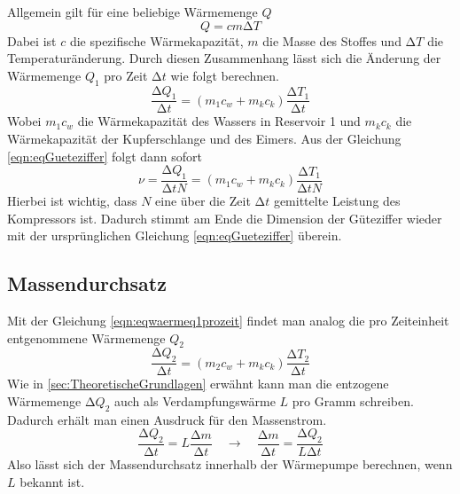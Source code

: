 Allgemein gilt für eine beliebige Wärmemenge $Q$
\begin{equation}
\label{eqn:allgwaerme}
Q = cm \increment T
\end{equation}
Dabei ist $c$ die spezifische Wärmekapazität, $m$ die Masse des Stoffes und $\increment T$ die Temperaturänderung.
Durch diesen Zusammenhang lässt sich die Änderung der Wärmemenge $Q_{1}$ pro Zeit $\increment t$ wie folgt berechnen.
\begin{equation}
\label{eqn:eqwaermeq1prozeit}
\frac{\increment Q_{1}}{\increment t} = (m_{1}c_{w} + m_{k}c_{k})\frac{\increment T_{1}}{\increment t}
\end{equation}
Wobei $m_{1}c_{w}$ die Wärmekapazität des Wassers in Reservoir 1 und $m_{k}c_{k}$ die Wärmekapazität der Kupferschlange und des Eimers.
Aus der Gleichung \eqref{eqn:eqGueteziffer} folgt dann sofort
\begin{equation}
\label{eqn:gueteziffermesswerte}
\nu = \frac{\increment Q_{1}}{\increment t N} = (m_{1}c_{w} + m_{k}c_{k})\frac{\increment T_{1}}{\increment t N}
\end{equation}
Hierbei ist wichtig, dass $N$ eine über die Zeit $\increment t$ gemittelte Leistung des Kompressors ist.
Dadurch stimmt am Ende die Dimension der Güteziffer wieder mit der ursprünglichen Gleichung \eqref{eqn:eqGueteziffer} überein.

\subsection{Massendurchsatz}
\label{sec:massedurchsatz}
Mit der Gleichung \eqref{eqn:eqwaermeq1prozeit} findet man analog die pro Zeiteinheit entgenommene Wärmemenge $Q_{2}$
\begin{equation}
\frac{\increment Q_{2}}{\increment t} = (m_{2}c_{w} + m_{k}c_{k})\frac{\increment T_{2}}{\increment t}
\end{equation}
Wie in \ref{sec:TheoretischeGrundlagen} erwähnt kann man die entzogene Wärmemenge $\increment Q_{2}$ auch als Verdampfungswärme $L$ pro Gramm schreiben.
Dadurch erhält man einen Ausdruck für den Massenstrom.
\begin{equation}
\frac{\increment Q_{2}}{\increment t} = L \frac{\increment m}{\increment t} \quad \to \quad \frac{\increment m}{\increment t} = \frac{\increment Q_{2}}{L \increment t}
\end{equation}
Also lässt sich der Massendurchsatz innerhalb der Wärmepumpe berechnen, wenn $L$ bekannt ist.

